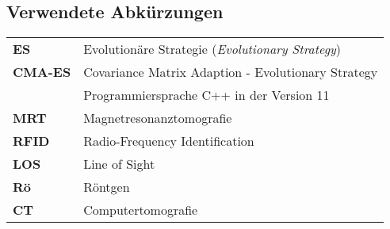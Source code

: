 \newpage
%
\subsection*{Verwendete Abkürzungen}
%
\begin{table} [H]
	\begin{center}
		\begin{tabular}{p{25mm}p{95mm}}
		      	\textbf{ES} & Evolutionäre Strategie (\textit{Evolutionary Strategy})\\
		      	\textbf{CMA-ES}  & Covariance Matrix Adaption - Evolutionary Strategy\\
		      	\textbf{\cpp11} & Programmiersprache C++ in der Version 11\\
		      	\textbf{MRT}	& Magnetresonanztomografie\\
		      	\textbf{RFID} & Radio-Frequency Identification\\
		      	\textbf{LOS} & Line of Sight\\
		      	\textbf{Rö} & Röntgen\\
		      	\textbf{CT} & Computertomografie\\
		\end{tabular}
	\end{center}
\end{table}

